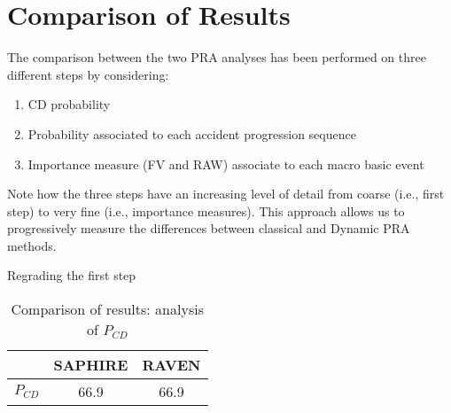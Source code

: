 \section{Comparison of Results }
\label{sec:comparison}

The comparison between the two PRA analyses has been performed on three different steps by considering:
\begin{enumerate}
	\item CD probability
	\item Probability associated to each accident progression sequence
	\item Importance measure (FV and RAW) associate to each macro basic event
\end{enumerate}
Note how the three steps have an increasing level of detail from coarse (i.e., first step) to very fine 
(i.e., importance measures).
This approach allows us to progressively measure the differences between classical and Dynamic PRA methods.

Regrading the first step 

\begin{table}
  \caption{Comparison of results: analysis of $P_{CD}$}
  \begin{tabular}{c | c | c } 
    \hline 
             & SAPHIRE & RAVEN \\ 
    \hline 
    $P_{CD}$ & 66.9    & 66.9 \\
    \hline 
  \end{tabular}
\end{table}


